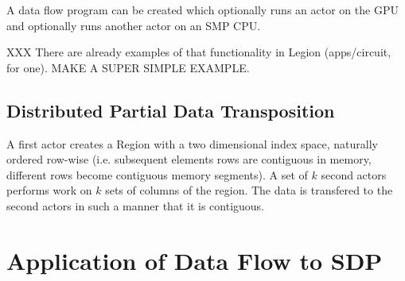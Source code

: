 \documentclass[11pt,a4paper]{article}
\begin{document}
A data flow program can be created which optionally runs an actor on the GPU and optionally runs another actor on an SMP CPU.

XXX There are already examples of that functionality in Legion (apps/circuit, for one).  MAKE A SUPER SIMPLE EXAMPLE.

\subsection{Distributed Partial Data Transposition}

A first actor creates a Region with a two dimensional index space, naturally ordered row-wise (i.e. subsequent elements rows are contiguous in memory, different rows become contiguous memory segments).  A set of $k$ second actors performs work on $k$ sets of columns of the region.  The data is transfered to the second actors in such a manner that it is contiguous.



\section{Application of Data Flow to SDP}
\label{sec:dataflow-sdp-application}
\end{document}
